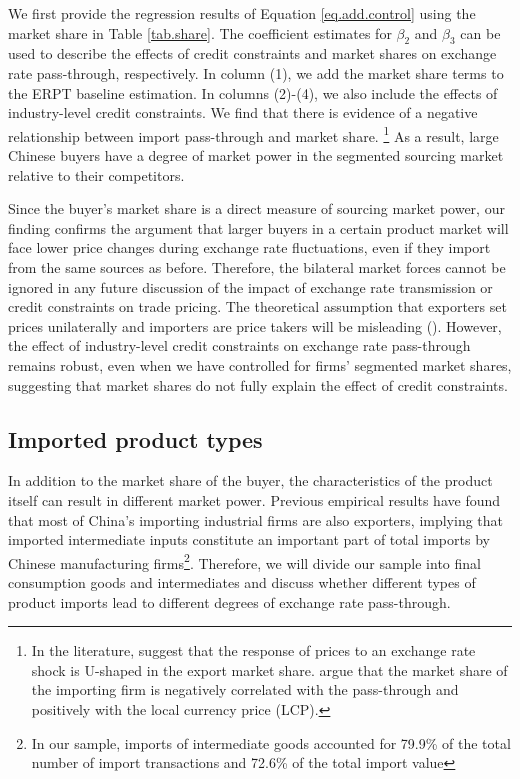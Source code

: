 We first provide the regression results of Equation \ref{eq.add.control} using the market share in Table \ref{tab.share}. The coefficient estimates for $\beta_2$ and $\beta_3$ can be used to describe the effects of credit constraints and market shares on exchange rate pass-through, respectively. In column (1), we add the market share terms to the ERPT baseline estimation. In columns (2)-(4), we also include the effects of industry-level credit constraints. We find that there is evidence of a negative relationship between import pass-through and market share. \footnote{In the literature, \cite{auer2016} suggest that the response of prices to an exchange rate shock is U-shaped in the export market share. \cite{devereux2017} argue that the market share of the importing firm is negatively correlated with the pass-through and positively with the local currency price (LCP).} As a result, large Chinese buyers have a degree of market power in the segmented sourcing market relative to their competitors.

Since the buyer's market share is a direct measure of sourcing market power, our finding confirms the argument that larger buyers in a certain product market will face lower price changes during exchange rate fluctuations, even if they import from the same sources as before. Therefore, the bilateral market forces cannot be ignored in any future discussion of the impact of exchange rate transmission or credit constraints on trade pricing. The theoretical assumption that exporters set prices unilaterally and importers are price takers will be misleading (\cite{alviarez2023}). However, the effect of industry-level credit constraints on exchange rate pass-through remains robust, even when we have controlled for firms' segmented market shares, suggesting that market shares do not fully explain the effect of credit constraints.

\subsection{Imported product types}

In addition to the market share of the buyer, the characteristics of the product itself can result in different market power. Previous empirical results have found that most of China's importing industrial firms are also exporters, implying that imported intermediate inputs constitute an important part of total imports by Chinese manufacturing firms\footnote{In our sample, imports of intermediate goods accounted for 79.9\% of the total number of import transactions and 72.6\% of the total import value}. Therefore, we will divide our sample into final consumption goods and intermediates and discuss whether different types of product imports lead to different degrees of exchange rate pass-through.

